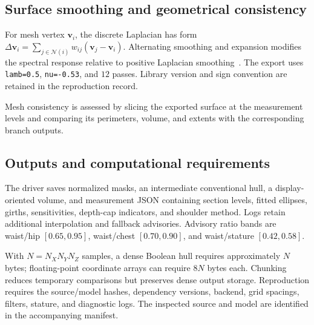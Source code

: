 \documentclass[11pt,a4paper]{article}
\numberwithin{equation}{section}
\begin{document}
\subsection{Surface smoothing and geometrical consistency}
For mesh vertex $\mathbf v_i$, the discrete Laplacian has form $\Delta\mathbf v_i=\sum_{j\in\mathcal N(i)}w_{ij}(\mathbf v_j-\mathbf v_i)$. Alternating smoothing and expansion modifies the spectral response relative to positive Laplacian smoothing~\cite{taubin1995signal}. The export uses \texttt{lamb=0.5}, \texttt{nu=-0.53}, and $12$ passes. Library version and sign convention are retained in the reproduction record.

Mesh consistency is assessed by slicing the exported surface at the measurement levels and comparing its perimeters, volume, and extents with the corresponding branch outputs.

\subsection{Outputs and computational requirements}
\label{subsec:reliability_flags}
The driver saves normalized masks, an intermediate conventional hull, a display-oriented volume, and measurement JSON containing section levels, fitted ellipses, girths, sensitivities, depth-cap indicators, and shoulder method. Logs retain additional interpolation and fallback advisories. Advisory ratio bands are waist/hip $[0.65,0.95]$, waist/chest $[0.70,0.90]$, and waist/stature $[0.42,0.58]$.

With $N=N_XN_YN_Z$ samples, a dense Boolean hull requires approximately $N$ bytes; floating-point coordinate arrays can require $8N$ bytes each. Chunking reduces temporary comparisons but preserves dense output storage. Reproduction requires the source/model hashes, dependency versions, backend, grid spacings, filters, stature, and diagnostic logs. The inspected source and model are identified in the accompanying manifest.
\end{document}
